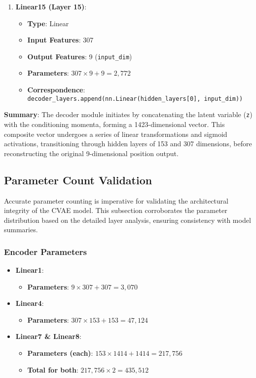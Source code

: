 \documentclass[10pt]{article}
\begin{document}
\begin{enumerate}
    \item \textbf{Linear15 (Layer 15)}:
    \begin{itemize}
        \item \textbf{Type}: Linear
        \item \textbf{Input Features}: 307
        \item \textbf{Output Features}: 9 (\texttt{input\_dim})
        \item \textbf{Parameters}: \( 307 \times 9 + 9 = 2,772 \)
        \item \textbf{Correspondence}: \texttt{decoder\_layers.append(nn.Linear(hidden\_layers[0], input\_dim))}
    \end{itemize}
\end{enumerate}

\textbf{Summary}: The decoder module initiates by concatenating the latent variable (\texttt{z}) with the conditioning momenta, forming a 1423-dimensional vector. This composite vector undergoes a series of linear transformations and sigmoid activations, transitioning through hidden layers of 153 and 307 dimensions, before reconstructing the original 9-dimensional position output.

\subsection{Parameter Count Validation}

Accurate parameter counting is imperative for validating the architectural integrity of the CVAE model. This subsection corroborates the parameter distribution based on the detailed layer analysis, ensuring consistency with model summaries.

\subsubsection{Encoder Parameters}

\begin{itemize}
    \item \textbf{Linear1}:
    \begin{itemize}
        \item \textbf{Parameters}: \( 9 \times 307 + 307 = 3,070 \)
    \end{itemize}
    
    \item \textbf{Linear4}:
    \begin{itemize}
        \item \textbf{Parameters}: \( 307 \times 153 + 153 = 47,124 \)
    \end{itemize}
    
    \item \textbf{Linear7 \& Linear8}:
    \begin{itemize}
        \item \textbf{Parameters (each)}: \( 153 \times 1414 + 1414 = 217,756 \)
        \item \textbf{Total for both}: \( 217,756 \times 2 = 435,512 \)
    \end{itemize}
\end{itemize}
\end{document}
